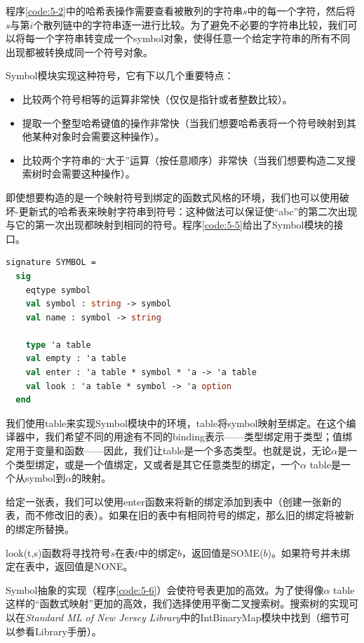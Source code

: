 \documentclass[cn,11pt,chinese]{elegantbook}
\begin{document}
程序\ref{code:5-2}中的哈希表操作需要查看被散列的字符串$s$中的每一个字符，然后将$s$与第$i$个散列链中的字符串逐一进行比较。为了避免不必要的字符串比较，我们可以将每一个字符串转变成一个symbol对象，使得任意一个给定字符串的所有不同出现都被转换成同一个符号对象。

Symbol模块实现这种符号，它有下以几个重要特点：

\begin{itemize}
  \item 比较两个符号相等的运算非常快（仅仅是指针或者整数比较）。	
  \item 提取一个整型哈希键值的操作非常快（当我们想要哈希表将一个符号映射到其他某种对象时会需要这种操作）。
  \item 比较两个字符串的“大于”运算（按任意顺序）非常快（当我们想要构造二叉搜索树时会需要这种操作）。
\end{itemize}

即使想要构造的是一个映射符号到绑定的函数式风格的环境，我们也可以使用破坏-更新式的哈希表来映射字符串到符号：这种做法可以保证使“abc”的第二次出现与它的第一次出现都映射到相同的符号。程序\ref{code:5-5}给出了Symbol模块的接口。

\begin{lstlisting}[language=ml,caption={SYMBOL的签名},label={code:5-5}]
  signature SYMBOL =
  sig
    eqtype symbol
    val symbol : string -> symbol
    val name : symbol -> string

    type 'a table
    val empty : 'a table
    val enter : 'a table * symbol * 'a -> 'a table
    val look : 'a table * symbol -> 'a option
  end
\end{lstlisting}

我们使用table来实现Symbol模块中的环境，table将symbol映射至绑定。在这个编译器中，我们希望不同的用途有不同的binding表示——类型绑定用于类型；值绑定用于变量和函数——因此，我们让table是一个多态类型。也就是说，无论$\alpha$是一个类型绑定，或是一个值绑定，又或者是其它任意类型的绑定，一个$\alpha$ table是一个从symbol到$\alpha$的映射。

给定一张表，我们可以使用enter函数来将新的绑定添加到表中（创建一张新的表，而不修改旧的表）。如果在旧的表中有相同符号的绑定，那么旧的绑定将被新的绑定所替换。

look(t,s)函数将寻找符号$s$在表$t$中的绑定$b$，返回值是SOME($b$)。如果符号并未绑定在表中，返回值是NONE。

Symbol抽象的实现（程序\ref{code:5-6}）会使符号表更加的高效。为了使得像$\alpha$ table这样的“函数式映射”更加的高效，我们选择使用平衡二叉搜索树。搜索树的实现可以在\textit{Standard ML of New Jersey Library}中的IntBinaryMap模块中找到（细节可以参看Library手册）。
\end{document}
